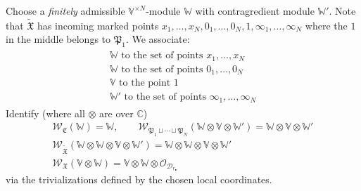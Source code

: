 \documentclass[11pt,b5paper,notitlepage]{article}
\theoremstyle{definition}
\theoremstyle{plain}
\newcommand{\fk}{\mathfrak}
\newcommand{\wtd}{\widetilde}
\newcommand{\blt}{\bullet}
\newcommand{\Vbb}{\mathbb V}
\newcommand{\Wbb}{\mathbb W}
\newcommand{\Cbb}{\mathbb C}
\newcommand{\<}{\left\langle}
\renewcommand{\>}{\right\rangle}
\newcommand{\MO}{\mathcal{O}}
\newcommand{\fx}{\mathfrak{X}}
\newcommand{\SW}{\mathscr{W}}
\newcommand{\MD}{\mathcal{D}}
\newcommand{\FC}{\mathfrak{C}}
\numberwithin{equation}{section}
\begin{document}
     
Choose a \emph{finitely} admissible $\Vbb^{\times N}$-module $\Wbb$ with contragredient module $\Wbb'$. Note that $\wtd{\fk X}$ has incoming marked points $x_1,\dots,x_N,0_1,\dots,0_N,1,\infty_1,\dots,\infty_N$ where the  $1$ in the middle belongs to $\fk P_1$. We associate:
\begin{gather}
\begin{gathered}
\Wbb\text{ to the set of points }x_1,\dots,x_N\\
\Wbb\text{ to the set of points }0_1,\dots,0_N\\
\Vbb\text{ to the point }1\\
\Wbb'\text{ to the set of points }\infty_1,\dots,\infty_N
\end{gathered}
\end{gather}
Identify (where all $\otimes$ are over $\Cbb$)
    \begin{gather*}
        \SW_{\FC}(\Wbb)=\Wbb,    \qquad    \SW_{\fk P_1\sqcup\cdots\sqcup\fk P_N}(\Wbb\otimes \Vbb\otimes \Wbb')=\Wbb\otimes \Vbb\otimes \Wbb'\\
        \SW_{\wtd{\fk X}}(\Wbb\otimes\Wbb\otimes\Vbb\otimes\Wbb')=\Wbb\otimes\Wbb\otimes\Vbb\otimes\Wbb'\\
        \SW_{\fx}(\Vbb\otimes \Wbb)=\Vbb\otimes \Wbb\otimes \MO_{\MD_{r_\blt}}
    \end{gather*}
via the trivializations defined by the chosen local coordinates. 
\end{document}
